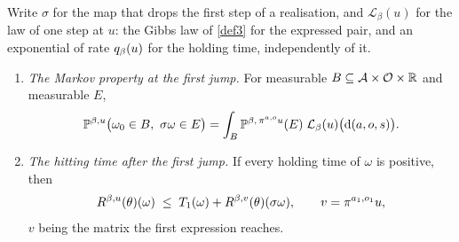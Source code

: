 \begin{lemma}
  \label{aux-restart}
  \leanok
  Write $\sigma$ for the map that drops the first step of a realisation, and
  $\mathcal{L}_\beta(u)$ for the law of one step at $u$: the Gibbs law of
  \ref{def3} for the expressed pair, and an exponential of rate
  $q_\beta(u)$ for the holding time, independently of it.
  \begin{enumerate}
    \item \emph{The Markov property at the first jump.}  For measurable
      $B \subseteq \mathcal{A} \times \mathcal{O} \times \mathbb{R}$ and measurable
      $E$,
      \[
        \mathbb{P}^{\beta,u}\bigl(\omega_0 \in B,\ \sigma\omega \in E\bigr)
          = \int_B \mathbb{P}^{\beta,\, \express{a}{o} u}(E)\;
            \mathcal{L}_\beta(u)\bigl(\mathrm{d}(a,o,s)\bigr).
      \]
    \item \emph{The hitting time after the first jump.}  If every holding time
      of $\omega$ is positive, then
      \[
        R^{\beta,u}(\theta)(\omega) \;\le\; T_1(\omega)
          + R^{\beta,v}(\theta)(\sigma\omega),
        \qquad v = \pi^{a_1,o_1} u ,
      \]
      $v$ being the matrix the first expression reaches.
  \end{enumerate}
\end{lemma}
